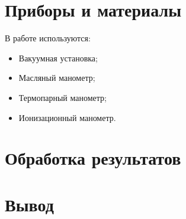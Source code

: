 \documentclass[12pt]{article}
\begin{document}
\section{Приборы и материалы}

В работе используются:

\begin{itemize}
	\item Вакуумная установка;
	\item Масляный манометр;
	\item Термопарный манометр;
	\item Ионизационный манометр.
\end{itemize}

\section{Обработка результатов}



\section{Вывод}
\end{document}
